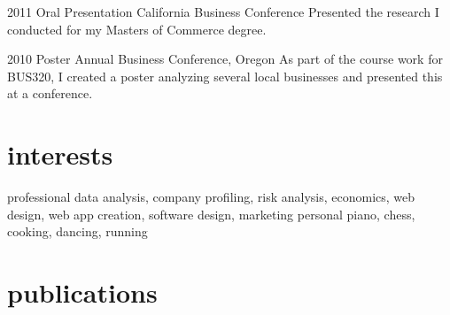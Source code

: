 \documentclass[a4paper]{cv-friggeri-k}
\begin{document}
\begin{entrylist}


\entry
{2011}
{Oral Presentation}
{California Business Conference}
{Presented the research I conducted for my Masters of Commerce degree.}


\entry
{2010}
{Poster}
{Annual Business Conference, Oregon}
{As part of the course work for BUS320, I created a poster analyzing several local businesses and presented this at a conference.}


\end{entrylist}


\section{interests}

\begin{notabentrylist}
\notabentry
{professional}
{data analysis, company profiling, risk analysis, economics, web design, web app creation, software design, marketing}
\notabentry
{personal}
{piano, chess, cooking, dancing, running}

\end{notabentrylist}


\section{publications}



\begin{refsection} %
\nocite{*}
\printbibliography[sorting=chronological, type=inproceedings, title={international peer-reviewed conferences/proceedings}, notkeyword={france}, heading=bibheading]
\end{refsection}
\end{document}
